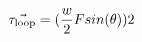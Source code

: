 \documentclass[preview]{standalone}
\begin{document}
\begin{align*}
\vec{\tau_{\text{loop}}} = ( {w \over 2} F sin(\theta) ) 2
\end{align*}
\end{document}
